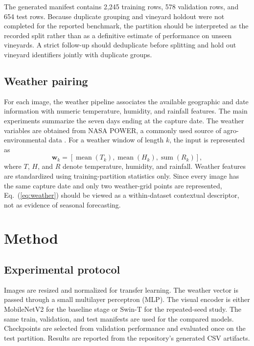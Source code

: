 \documentclass[conference]{IEEEtran}
\begin{document}
The generated manifest contains 2,245 training rows, 578 validation rows, and 654 test rows. Because duplicate grouping and vineyard holdout were not completed for the reported benchmark, the partition should be interpreted as the recorded split rather than as a definitive estimate of performance on unseen vineyards. A strict follow-up should deduplicate before splitting and hold out vineyard identifiers jointly with duplicate groups.

\subsection{Weather pairing}
For each image, the weather pipeline associates the available geographic and date information with numeric temperature, humidity, and rainfall features. The main experiments summarize the seven days ending at the capture date. The weather variables are obtained from NASA POWER, a commonly used source of agro-environmental data \cite{nasa_power}. For a weather window of length $k$, the input is represented as
\begin{equation}
\mathbf{w}_{k} =
\left[\operatorname{mean}(T_{k}),\operatorname{mean}(H_{k}),\operatorname{sum}(R_{k})\right],
\label{eq:weather}
\end{equation}
where $T$, $H$, and $R$ denote temperature, humidity, and rainfall. Weather features are standardized using training-partition statistics only. Since every image has the same capture date and only two weather-grid points are represented, Eq.~(\ref{eq:weather}) should be viewed as a within-dataset contextual descriptor, not as evidence of seasonal forecasting.

\section{Method}
\subsection{Experimental protocol}
Images are resized and normalized for transfer learning. The weather vector is passed through a small multilayer perceptron (MLP). The visual encoder is either MobileNetV2 for the baseline stage or Swin-T for the repeated-seed study. The same train, validation, and test manifests are used for the compared models. Checkpoints are selected from validation performance and evaluated once on the test partition. Results are reported from the repository's generated CSV artifacts.
\end{document}
